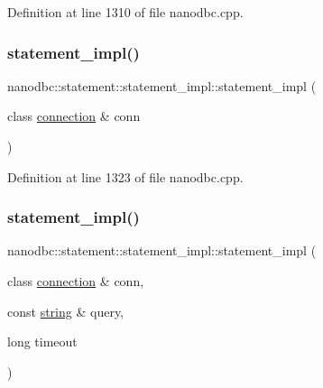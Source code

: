 Definition at line 1310 of file nanodbc.\+cpp.

\mbox{\label{classnanodbc_1_1statement_1_1statement__impl_af6e417a2d908b8d7aa8e243097560a42}} 
\subsubsection{\texorpdfstring{statement\_impl()}{statement\_impl()}\hspace{0.1cm}{\footnotesize\ttfamily [3/4]}}
{\footnotesize\ttfamily nanodbc\+::statement\+::statement\+\_\+impl\+::statement\+\_\+impl (\begin{DoxyParamCaption}\item[{class \mbox{\hyperlink{classnanodbc_1_1connection}{connection}} \&}]{conn }\end{DoxyParamCaption})\hspace{0.3cm}{\ttfamily [inline]}}



Definition at line 1323 of file nanodbc.\+cpp.

\mbox{\label{classnanodbc_1_1statement_1_1statement__impl_aeb976ed1c29dc5325bd00034033e0967}} 
\subsubsection{\texorpdfstring{statement\_impl()}{statement\_impl()}\hspace{0.1cm}{\footnotesize\ttfamily [4/4]}}
{\footnotesize\ttfamily nanodbc\+::statement\+::statement\+\_\+impl\+::statement\+\_\+impl (\begin{DoxyParamCaption}\item[{class \mbox{\hyperlink{classnanodbc_1_1connection}{connection}} \&}]{conn,  }\item[{const \mbox{\hyperlink{namespacenanodbc_abfc0ece56278e590911ec8352774c212}{string}} \&}]{query,  }\item[{long}]{timeout }\end{DoxyParamCaption})\hspace{0.3cm}{\ttfamily [inline]}}



